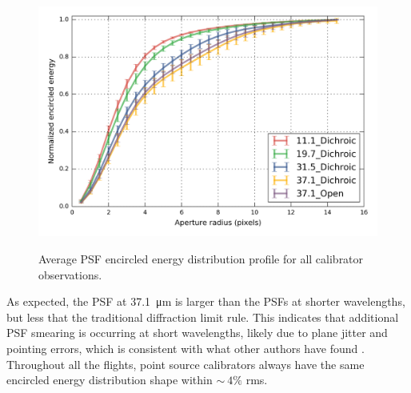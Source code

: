 \begin{figure}[!h]
\begin{center}
\includegraphics[width=\textwidth]{Figures/average.png}
\label{fig:average_EE}
\vspace{-0.5cm}
\caption[PSF size]{Average PSF encircled energy distribution profile for all calibrator observations.}
\end{center}
\end{figure}


As expected, the PSF at \SI{37.1}{\micro\meter} is larger than the PSFs at shorter wavelengths, but less that the traditional diffraction limit rule. This indicates that additional PSF smearing is occurring at short wavelengths, likely due to plane jitter and pointing errors, which is consistent with what other authors have found \citep[e.g.][]{Herter:2013by}. Throughout all the flights, point source calibrators always have the same encircled energy distribution shape within $\sim~4\%$ rms. 

